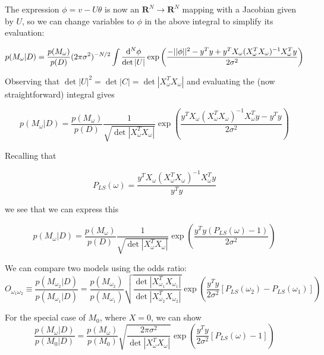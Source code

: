 \documentclass[12pt,pdftex]{article}
\begin{document}
The expression $\phi = v - U\theta$ is now an $\mathbf{R}^N\to\mathbf{R}^N$ mapping with a Jacobian given by $U$, so we can change variables to $\phi$ in the above integral to simplify its evaluation:

\begin{equation}
  p(M_\omega|D) = \frac{p(M_\omega)}{p(D)}(2\pi\sigma^2)^{-N/2}
\int\frac{{\rm d}^N\phi}{\det|U|}\exp\left(\frac{-||\phi||^2 - y^Ty + y^TX_\omega(X_\omega^TX_\omega)^{-1}X_\omega^Ty}{2\sigma^2}\right)
\end{equation}

Observing that $\det|U|^2 = \det|C| = \det|X_\omega^TX_\omega|$ and evaluating the (now straightforward) integral gives

\begin{equation}
  p(M_\omega|D) = \frac{p(M_\omega)}{p(D)}\frac{1}{\sqrt{\det|X_\omega^TX_\omega|}}
  \exp\left(\frac{y^TX_\omega(X_\omega^TX_\omega)^{-1}X_\omega^Ty - y^Ty}{2\sigma^2}\right)
\end{equation}

Recalling that

\begin{equation}
  P_{LS}(\omega) = \frac{y^TX_\omega(X_\omega^TX_\omega)^{-1}X_\omega^Ty}{y^Ty}
\end{equation}

we see that we can express this

\begin{equation}
  p(M_\omega|D) = \frac{p(M_\omega)}{p(D)}\frac{1}{\sqrt{\det|X_\omega^TX_\omega|}}
  \exp\left(\frac{y^Ty(P_{LS}(\omega) - 1)}{2\sigma^2}\right)
\end{equation}

We can compare two models using the odds ratio:
\begin{equation}
  O_{\omega_1\omega_2} \equiv \frac{p(M_{\omega_2}|D)}{p(M_{\omega_1}|D)}
  =\frac{p(M_{\omega_2})}{p(M_{\omega_1})}\sqrt{\frac{\det|X_{\omega_1}^TX_{\omega_1}|}{\det|X_{\omega_2}^TX_{\omega_2}|}}\exp\left(\frac{y^Ty}{2\sigma^2}\left[P_{LS}(\omega_2) - P_{LS}(\omega_1)\right]\right)
\end{equation}

For the special case of $M_0$, where $X = 0$, we can show
\begin{equation}
\frac{p(M_{\omega}|D)}{p(M_0|D)} =
\frac{p(M_{\omega})}{p(M_0)}\sqrt{\frac{2\pi\sigma^2}{\det|X_\omega^TX_\omega|}}\exp\left(\frac{y^Ty}{2\sigma^2}\left[P_{LS}(\omega) - 1\right]\right)
\end{equation}
\end{document}
